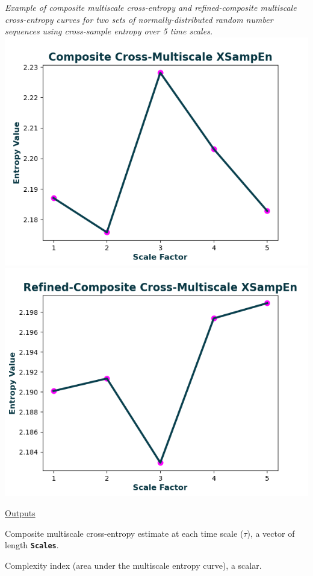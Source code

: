 \documentclass[12pt, a4paper, titlepage, openany]{book}
\begin{document}
\begin{description}[labelsep=1cm, labelwidth=2cm, nosep, style=multiline,leftmargin=3cm]
							\textit{Example of composite multiscale cross-entropy and refined-composite multiscale cross-entropy curves for two sets of normally-distributed random number sequences using cross-sample entropy over 5 time scales.}\\
							\includegraphics[scale=.65]{cXMSEn1.png}\\
							\includegraphics[scale=.65]{rcXMSEn1.png}
\end{description}

\noindent \ul{Outputs}
\begin{description}[labelsep=1cm, labelwidth=2cm, nosep, style=multiline,leftmargin=3cm]\footnotesize
\item[\texttt{MSx}]		Composite multiscale cross-entropy estimate at each time scale ($\tau$), a vector of length \textbf{\texttt{Scales}}.
\item[\texttt{Ci}]		Complexity index (area under the multiscale entropy curve), a scalar.
\end{description}
\end{document}
